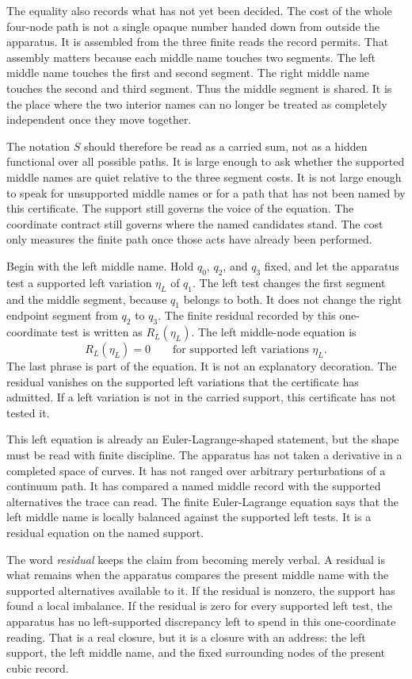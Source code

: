 The equality also records what has not yet been decided. The cost of the whole
four-node path is not a single opaque number handed down from outside the
apparatus. It is assembled from the three finite reads the record permits.
That assembly matters because each middle name touches two segments. The left
middle name touches the first and second segment. The right middle name
touches the second and third segment. Thus the middle segment is shared. It is
the place where the two interior names can no longer be treated as completely
independent once they move together.

The notation \(S\) should therefore be read as a carried sum, not as a hidden
functional over all possible paths. It is large enough to ask whether the
supported middle names are quiet relative to the three segment costs. It is
not large enough to speak for unsupported middle names or for a path that has
not been named by this certificate. The support still governs the voice of the
equation. The coordinate contract still governs where the named candidates
stand. The cost only measures the finite path once those acts have already
been performed.

Begin with the left middle name. Hold \(q_0\), \(q_2\), and \(q_3\) fixed, and
let the apparatus test a supported left variation \(\eta_L\) of \(q_1\). The
left test changes the first segment and the middle segment, because \(q_1\)
belongs to both. It does not change the right endpoint segment from \(q_2\) to
\(q_3\). The finite residual recorded by this one-coordinate test is written
as \(R_L(\eta_L)\). The left middle-node equation is
\[
  R_L(\eta_L)=0
  \qquad \text{for supported left variations }\eta_L .
\]
The last phrase is part of the equation. It is not an explanatory decoration.
The residual vanishes on the supported left variations that the certificate
has admitted. If a left variation is not in the carried support, this
certificate has not tested it.

This left equation is already an Euler-Lagrange-shaped statement, but the
shape must be read with finite discipline. The apparatus has not taken a
derivative in a completed space of curves. It has not ranged over arbitrary
perturbations of a continuum path. It has compared a named middle record with
the supported alternatives the trace can read. The finite Euler-Lagrange
equation says that the left middle name is locally balanced against the
supported left tests. It is a residual equation on the named support.

The word \emph{residual} keeps the claim from becoming merely verbal. A residual is
what remains when the apparatus compares the present middle name with the
supported alternatives available to it. If the residual is nonzero, the
support has found a local imbalance. If the residual is zero for every
supported left test, the apparatus has no left-supported discrepancy left to
spend in this one-coordinate reading. That is a real closure, but it is a
closure with an address: the left support, the left middle name, and the
fixed surrounding nodes of the present cubic record.

